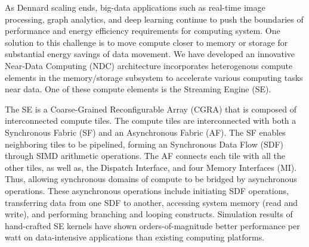 As Dennard scaling ends, big-data applications such as real-time image processing, graph analytics, and deep learning continue to push the boundaries of performance and energy efficiency requirements for computing system. 
One solution to this challenge is to move compute closer to memory or storage for substantial energy savings of data movement. 
We have developed an innovative Near-Data Computing (NDC) architecture incorporates heterogenous compute elements in the memory/storage subsystem to accelerate various computing tasks near data. 
One of these compute elements is the Streaming Engine (SE).

The SE is a Coarse-Grained Reconfigurable Array (CGRA) that is composed of interconnected compute tiles.  
The compute tiles are interconnected with both a Synchronous Fabric (SF) and an Asynchronous Fabric (AF).
The SF enables neighboring tiles to be pipelined, forming an Synchronous Data Flow (SDF) through SIMD arithmetic operations.
The AF connects each tile with all the other tiles, as well as, the Dispatch Interface, and four Memory Interfaces (MI).
Thus, allowing synchronous domains of compute to be bridged by asynchronous operations.
These asynchronous operations include initiating SDF operations, transferring data from one SDF to another, accessing system memory (read and write), and performing branching and looping constructs.
Simulation results of hand-crafted SE kernels have shown orders-of-magnitude better performance per watt on data-intensive applications than existing computing platforms.

